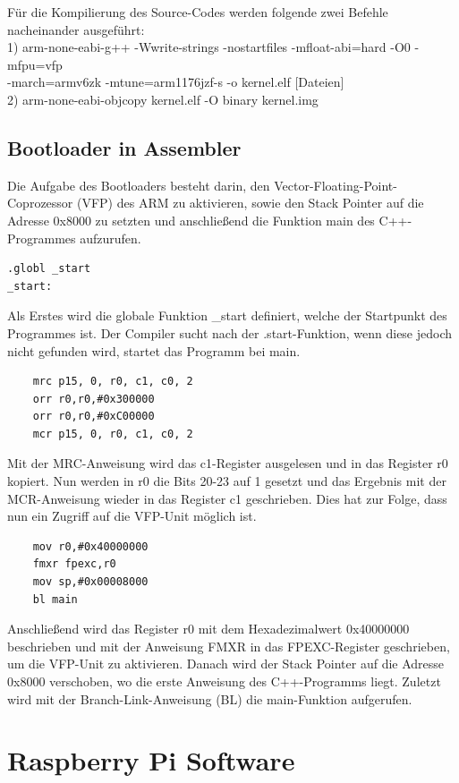 \documentclass[12pt]{article}
\begin{document}
Für die Kompilierung des Source-Codes werden folgende zwei Befehle nacheinander ausgeführt:\\
1) arm-none-eabi-g++ -Wwrite-strings -nostartfiles -mfloat-abi=hard -O0 -mfpu=vfp\\
     -march=armv6zk -mtune=arm1176jzf-s -o kernel.elf [Dateien]
\\2)    arm-none-eabi-objcopy kernel.elf -O binary kernel.img
\subsection{Bootloader in Assembler}
Die Aufgabe des Bootloaders besteht darin, den Vector-Floating-Point-Coprozessor (VFP) des ARM zu aktivieren, sowie den Stack Pointer auf die Adresse 0x8000 zu setzten und anschließend die Funktion main des C++-Programmes aufzurufen. \\
\begin{verbatim}
.globl _start
_start:
\end{verbatim}
Als Erstes wird die globale Funktion \_start definiert, welche der Startpunkt des Programmes ist. Der Compiler sucht nach der .start-Funktion, wenn diese jedoch nicht gefunden wird, startet das Programm bei main.\\
\begin{verbatim}
    mrc p15, 0, r0, c1, c0, 2
    orr r0,r0,#0x300000
    orr r0,r0,#0xC00000
    mcr p15, 0, r0, c1, c0, 2
\end{verbatim}
Mit der MRC-Anweisung wird das c1-Register ausgelesen und in das Register r0 kopiert. Nun werden in r0 die Bits 20-23 auf 1 gesetzt und das Ergebnis mit der MCR-Anweisung wieder in das Register c1 geschrieben. Dies hat zur Folge, dass nun ein Zugriff auf die VFP-Unit möglich ist.\\
\begin{verbatim}
    mov r0,#0x40000000
    fmxr fpexc,r0
    mov sp,#0x00008000
    bl main
\end{verbatim}
Anschließend wird das Register r0 mit dem Hexadezimalwert 0x40000000 beschrieben und mit der Anweisung FMXR in das FPEXC-Register geschrieben, um die VFP-Unit zu aktivieren. Danach wird der Stack Pointer auf die Adresse 0x8000 verschoben, wo die erste Anweisung des C++-Programms liegt. Zuletzt wird mit der Branch-Link-Anweisung (BL) die main-Funktion aufgerufen.
\newpage\section{Raspberry Pi Software}
\end{document}
